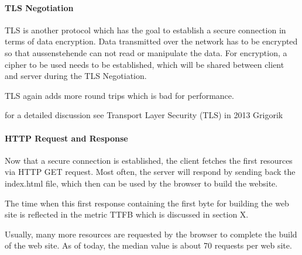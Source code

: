 





\paragraph{TLS Negotiation}

TLS is another protocol which has the goal to establish a secure connection in terms of data encryption.
Data transmitted over the network has to be encrypted so that aussenstehende can not read or manipulate the data.
For encryption,  a cipher to be used needs to be established, which will be shared between client and server during the TLS Negotiation. %

TLS again adds more round trips which is bad for performance.

for a detailed discussion see Transport Layer Security (TLS) in 2013 Grigorik %





\paragraph{HTTP Request and Response}

Now that a secure connection is established, the client fetches the first resources via HTTP GET request.
Most often, the server will respond by sending back the index.html file, which then can be used by the browser to build the website. %

The time when this first response containing the first byte for building the web site is reflected in the metric TTFB which is discussed in section X.



Usually, many more resources are requested by the browser to complete the build of the web site.
As of today, the median value is about 70 requests per web site. %

